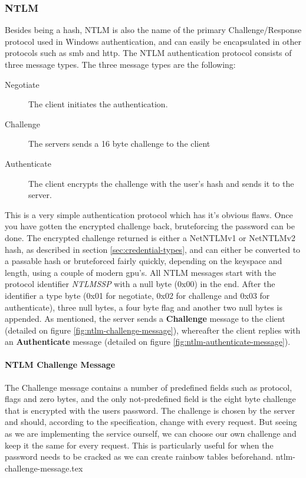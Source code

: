 \documentclass{article}
\begin{document}
\subsubsection{NTLM}
Besides being a hash, NTLM is also the name of the primary Challenge/Response protocol used in Windows authentication, and can easily be encapsulated in other protocols such as \gls{smb} and \gls{http}. The NTLM authentication protocol consists of three message types\cite{url:microsoft:ntlm-message-syntax}. The three message types are the following:

\begin{description}
    \item[Negotiate] The client initiates the authentication.
    \item[Challenge] The servers sends a 16 byte challenge to the client
    \item[Authenticate] The client encrypts the challenge with the user's hash and sends it to the server.
\end{description}

This is a very simple authentication protocol which has it's obvious flaws. Once you have gotten the encrypted challenge back, bruteforcing the password can be done. The encrypted challenge returned is either a NetNTLMv1 or NetNTLMv2 hash, as described in section \ref{sec:credential-types}, and can either be converted to a passable hash or bruteforced fairly quickly, depending on the keyspace and length, using a couple of modern \gls{gpu}'s. All NTLM messages start with the protocol identifier \emph{NTLMSSP} with a null byte (0x00) in the end\cite{url:http-ntlm-authentication}. After the identifier a type byte (0x01 for negotiate, 0x02 for challenge and 0x03 for authenticate), three null bytes, a four byte flag and another two null bytes is appended. As mentioned, the server sends a \textbf{Challenge} message to the client (detailed on figure \ref{fig:ntlm-challenge-message}), whereafter the client replies with an \textbf{Authenticate} message (detailed on figure \ref{fig:ntlm-authenticate-message}).

\paragraph{NTLM Challenge Message}
The Challenge message contains a number of predefined fields such as protocol, flags and zero bytes, and the only not-predefined field is the eight byte challenge that is encrypted with the users password. The challenge is chosen by the server and should, according to the specification, change with every request. But seeing as we are implementing the service ourself, we can choose our own challenge and keep it the same for every request. This is particularly useful for when the password needs to be cracked as we can create rainbow tables beforehand.
{ntlm-challenge-message.tex}
\end{document}
